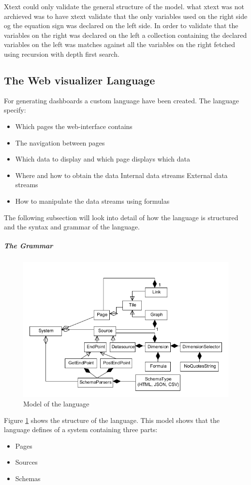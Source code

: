 Xtext could only validate the general structure of the model.
what xtext was not archieved was to have xtext validate that the only variables used
on the right side og the equation sign was declared on the left side.
In order to validate that the variables on the right was declared on the left a
collection containing the declared variables on the left was matches against all the variables
on the right fetched using recursion with depth first search.

\subsection{The Web visualizer Language}
For generating dashboards a custom language have been created.
The language specify:
\begin{itemize}
\item Which pages the web-interface contains
\item The navigation between pages
\item Which data to display and which page displays which data
\item Where and how to obtain the data
\subitem Internal data streams
\subitem External data streams
\item How to manipulate the data streams using formulas
\end{itemize}
The following subsection will look into detail of how the language is structured and the
syntax and grammar of the language.

\subparagraph{The Grammar}
\begin{figure}
\begin{center}
\includegraphics[width=\linewidth]{images/languagemodel}
\end{center}
\caption{Model of the language}
\label{fig:languagemodel}
\end{figure}
Figure \ref{fig:languagemodel} shows the structure of the language.
This model shows that the language defines of a system containing three parts:
\begin{itemize}
\item Pages
\item Sources
\item Schemas
\end{itemize}

